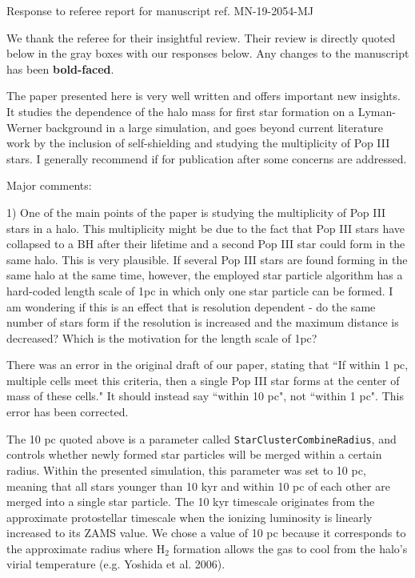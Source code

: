 \documentclass[11pt]{article}
\newenvironment{referee}[1][]{%
    \ignorespaces%
    \begin{mdframed}[style=myquotestyle,#1]%
}{%
    \end{mdframed}%
    \ignorespacesafterend%
}%
\begin{document}
\begin{center} 
\bfseries{
\begin{large}
  Response to referee report for manuscript ref. MN-19-2054-MJ
\end{large}
}
\end{center}

We thank the referee for their insightful review.  Their review is directly quoted below in the gray boxes with our responses below.  Any changes to the manuscript has been \textbf{bold-faced}.

\begin{referee}
The paper presented here is very well written and offers important new insights.  It studies the dependence of the halo mass for first star formation on a Lyman-Werner background in a large simulation, and goes beyond current literature work by the inclusion of self-shielding and studying the multiplicity of Pop III stars. I generally recommend if for publication after some concerns are addressed.
\end{referee}


\begin{referee}
Major comments:

1) One of the main points of the paper is studying the multiplicity of Pop III stars in a halo. This multiplicity might be due to the fact that Pop III stars have collapsed to a BH after their lifetime and a second Pop III star could form in the same halo. This is very plausible. If several Pop III stars are found forming in the same halo at the same time, however, the employed star particle algorithm has a hard-coded length scale of 1pc in which only one star particle can be formed. I am wondering if this is an effect that is resolution dependent - do the same number of stars form if the resolution is increased and the maximum distance is decreased? Which is the motivation for the length scale of 1pc?
\end{referee}
There was an error in the original draft of our paper, stating that ``If within 1 pc, multiple cells meet this criteria, then a single Pop III star forms at the center of mass of these cells." It should instead say ``within 10 pc", not ``within 1 pc". This error has been corrected.

The 10 pc quoted above is a parameter called \texttt{StarClusterCombineRadius}, and controls whether newly formed star particles will be merged within a certain radius. Within the presented simulation, this parameter was set to 10 pc, meaning that all stars younger than 10 kyr and within 10 pc of each other are merged into a single star particle.  The 10 kyr timescale originates from the approximate protostellar timescale when the ionizing luminosity is linearly increased to its ZAMS value. We chose a value of 10 pc because it corresponds to the approximate radius where H$_2$ formation allows the gas to cool from the halo's virial temperature (e.g. Yoshida et al. 2006).
\end{document}
